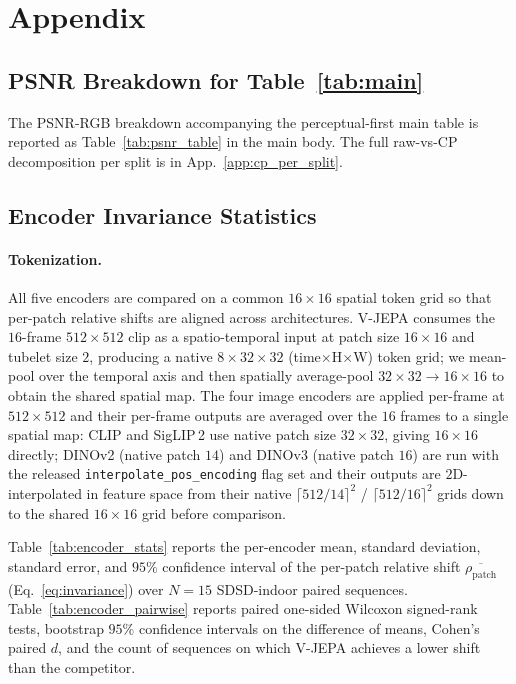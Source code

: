 \section{Appendix}

\subsection{PSNR Breakdown for Table~\ref{tab:main}}\label{app:psnr_table}

The PSNR-RGB breakdown accompanying the perceptual-first main table is reported as Table~\ref{tab:psnr_table} in the main body. The full raw-vs-CP decomposition per split is in App.~\ref{app:cp_per_split}.


\subsection{Encoder Invariance Statistics}\label{app:encoder_stats}

\paragraph{Tokenization.} All five encoders are compared on a common $16{\times}16$ spatial token grid so that per-patch relative shifts are aligned across architectures. V-JEPA consumes the $16$-frame $512{\times}512$ clip as a spatio-temporal input at patch size $16{\times}16$ and tubelet size $2$, producing a native $8{\times}32{\times}32$ (time$\times$H$\times$W) token grid; we mean-pool over the temporal axis and then spatially average-pool $32{\times}32\!\to\!16{\times}16$ to obtain the shared spatial map. The four image encoders are applied per-frame at $512{\times}512$ and their per-frame outputs are averaged over the $16$ frames to a single spatial map: CLIP and SigLIP\,2 use native patch size $32{\times}32$, giving $16{\times}16$ directly; DINOv2 (native patch $14$) and DINOv3 (native patch $16$) are run with the released \texttt{interpolate\_pos\_encoding} flag set and their outputs are $2$D-interpolated in feature space from their native $\lceil 512/14\rceil^{2}$ / $\lceil 512/16\rceil^{2}$ grids down to the shared $16{\times}16$ grid before comparison.

Table~\ref{tab:encoder_stats} reports the per-encoder mean, standard deviation, standard error, and $95\%$ confidence interval of the per-patch relative shift $\overline{\rho_{\text{patch}}}$ (Eq.~\ref{eq:invariance}) over $N{=}15$ SDSD-indoor paired sequences. Table~\ref{tab:encoder_pairwise} reports paired one-sided Wilcoxon signed-rank tests, bootstrap $95\%$ confidence intervals on the difference of means, Cohen's paired $d$, and the count of sequences on which V-JEPA achieves a lower shift than the competitor.

